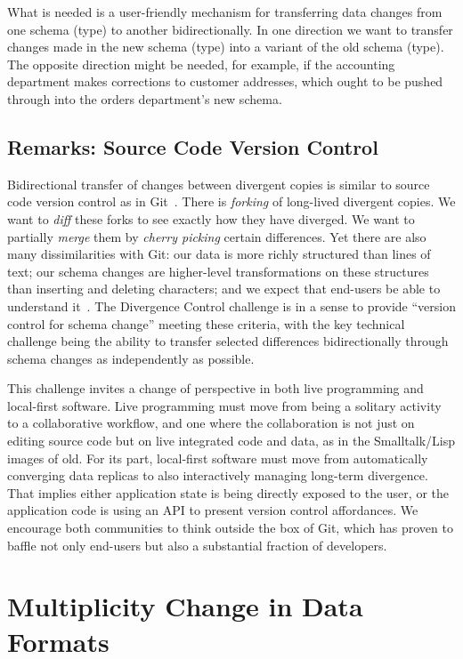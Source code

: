 \documentclass[english,submission]{programming}
\begin{document}
What is needed is a user-friendly mechanism for transferring data changes from one schema (type) to
another bidirectionally. In one direction we want to transfer changes made in the new schema (type)
into a variant of the old schema (type). The opposite direction might be needed, for example,
if the accounting department makes corrections to customer addresses, which ought to be pushed
through into the orders department's new schema.

\subsection*{Remarks: Source Code Version Control}

Bidirectional transfer of changes between divergent copies is similar to source code version
control as in Git~\cite{ProGit}. There is \textit{forking} of long-lived divergent copies.
We want to \textit{diff} these forks to see exactly how they have diverged. We want to
partially \textit{merge} them by \textit{cherry picking} certain differences. Yet there are
also many dissimilarities with Git: our data is more richly structured than lines of text; our
schema changes are higher-level transformations on these structures than inserting and
deleting characters; and we expect that end-users be able to understand it~\cite{gitless}.
The Divergence Control challenge is in a sense to provide ``version control for schema
change'' meeting these criteria, with the key technical challenge being the ability to
transfer selected differences bidirectionally through schema changes as independently as possible.

This challenge invites a change of perspective in both live programming and local-first software.
Live programming must move from being a solitary activity to a collaborative workflow, and one
where the collaboration is not just on editing source code but on live integrated code and data,
as in the Smalltalk/Lisp images of old.
For its part, local-first software must move from automatically converging data replicas
to also interactively managing long-term divergence. That implies either application state
is being directly exposed to the user, or the application code is using an API to present
version control affordances. We encourage both communities to think outside the box of Git,
which has proven to baffle not only end-users but also a substantial fraction of developers.

\section{Multiplicity Change in Data Formats}
\end{document}
